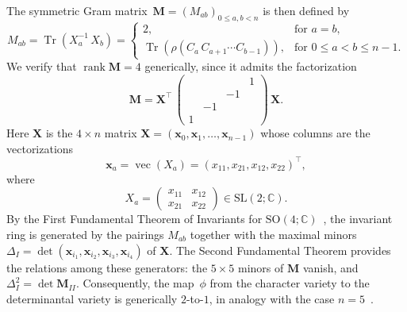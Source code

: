 \documentclass[12pt,reqno]{amsart}
\DeclareMathOperator{\rank}{rank}
\DeclareMathOperator{\Tr}{Tr}
\begin{document}
The
symmetric Gram matrix~$\mathbf{M}=(M_{ab})_{0\leq a,b <n}$
is then defined by
\begin{equation}
  \label{define_Gram}
  M_{a b}=
  \Tr \left( X_a^{-1} \, X_b \right)
  =
  \begin{cases}
    2, & \text{for $a=b$},
    \\
    \Tr\left(
    \rho(C_a  \, C_{a+1}\cdots C_{b-1})
    \right),
    &
    \text{for $0\leq a<b \leq n-1$}.
  \end{cases}
\end{equation}
We verify that 
$\rank \mathbf{M}=4$ generically,
since
it admits the factorization
\begin{equation}
  \label{eq:1}
  \mathbf{M}
  =
  \mathbf{X}^\top
  \,
  \begin{pmatrix}
    &&& 1\\
    && -1 & \\
    & -1 &&\\
    1 &&&
  \end{pmatrix}
  \,
  \mathbf{X} .
\end{equation}
Here
$\mathbf{X}$ is the $4 \times n$ matrix
$\mathbf{X}=
\left(
  \mathbf{x}_0,\mathbf{x}_1,\dots, \mathbf{x}_{n-1}
\right)$
whose columns are the vectorizations
\begin{equation*}
  \mathbf{x}_a=
  \operatorname{vec}(X_a)=
  \left(x_{11}, x_{21}, x_{12}, x_{22}
  \right)^\top ,
\end{equation*}
where
\begin{equation*}
  X_a=
  \begin{pmatrix}
    x_{11} & x_{12} \\
    x_{21} & x_{22}
  \end{pmatrix}
  \in \mathrm{SL}(2;\mathbb{C}) .
\end{equation*}
By the First  Fundamental Theorem of Invariants for
$\mathrm{SO}(4;\mathbb{C})$~\cite{Weyl39Book},
the invariant ring is generated by the pairings $M_{ab}$ together with
the maximal minors
$\Delta_I=\det(\mathbf{x}_{i_1}, \mathbf{x}_{i_2},
\mathbf{x}_{i_3}, \mathbf{x}_{i_4})$ of $\mathbf{X}$.
The Second Fundamental Theorem provides the  relations among these
generators:
the $5\times 5$ minors of $\mathbf{M}$ vanish,
and
$\Delta_I^2= \det \mathbf{M}_{I I}$.
Consequently,
the map~$\phi$ from the character variety to the determinantal
variety is generically $2$-to-$1$,
in analogy with the case $n=5$~\cite{Simpson18a,KHikami26a}.
\end{document}
